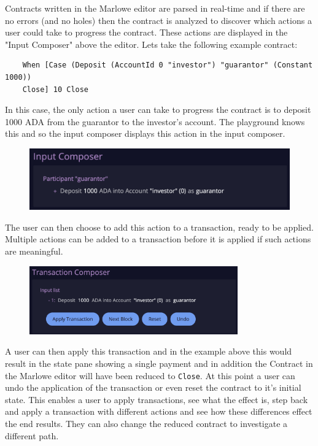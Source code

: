 \documentclass[runningheads]{llncs}
\begin{document}
Contracts written in the Marlowe editor are parsed in real-time and if there are no errors (and no holes) then the contract is analyzed to discover which actions a user could take to progress the contract. These actions are displayed in the "Input Composer" above the editor. Lets take the following example contract:
\begin{verbatim}
    When [Case (Deposit (AccountId 0 "investor") "guarantor" (Constant 1000)) 
    Close] 10 Close
\end{verbatim}
In this case, the only action a user can take to progress the contract is to deposit 1000 ADA from the guarantor to the investor's account. The playground knows this and so the input composer displays this action in the input composer.

\begin{figure}[]
    \includegraphics[width=1\textwidth]{input_composer.png}
\end{figure}
The user can then choose to add this action to a transaction, ready to be applied. Multiple actions can be added to a transaction before it is applied if such actions are meaningful.

\begin{figure}[]
    \includegraphics[width=0.8\textwidth]{tx_composer.png}
\end{figure}
A user can then apply this transaction and in the example above this would result in the state pane showing a single payment and in addition the Contract in the Marlowe editor will have been reduced to \lstinline{Close}. At this point a user can undo the application of the transaction or even reset the contract to it's initial state. This enables a user to apply transactions, see what the effect is, step back and apply a transaction with different actions and see how these differences effect the end results. They can also change the reduced contract to investigate a different path.
\end{document}
